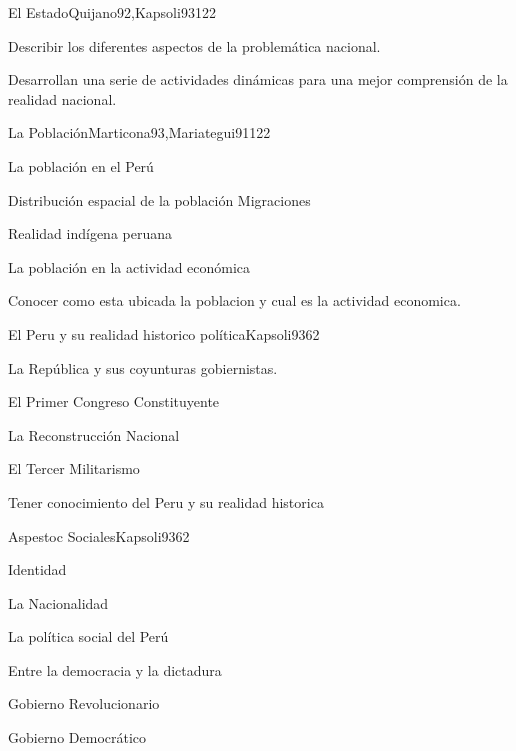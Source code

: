 \begin{syllabus}
\begin{unit}{El Estado}{Quijano92,Kapsoli93}{12}{2}
\begin{learningoutcomes}
      \item Describir los diferentes aspectos de la problemática nacional.
      \item Desarrollan una serie de actividades dinámicas para una mejor comprensión de la realidad nacional.
   \end{learningoutcomes}
\end{unit}

\begin{unit}{La Población}{Marticona93,Mariategui91}{12}{2}
\begin{topics}
	\item La población en el Perú
	\item Distribución espacial de la población Migraciones
	\item Realidad indígena peruana
	\item La población en la actividad económica
\end{topics}

\begin{learningoutcomes}
      \item Conocer como esta ubicada la poblacion y cual es la actividad economica.
   \end{learningoutcomes}
\end{unit}

\begin{unit}{El Peru y su realidad historico política}{Kapsoli93}{6}{2}
\begin{topics}
	\item La República y sus coyunturas gobiernistas.
	\item El Primer Congreso Constituyente
	\item La Reconstrucción Nacional
	\item El Tercer Militarismo
\end{topics}

\begin{learningoutcomes}
      \item Tener conocimiento del Peru y su realidad historica
\end{learningoutcomes}
\end{unit}

\begin{unit}{Aspestoc Sociales}{Kapsoli93}{6}{2}
\begin{topics}
	\item Identidad
	\item La Nacionalidad
	\item La política social del Perú
	\item Entre la democracia y la dictadura
	\item Gobierno Revolucionario
	\item Gobierno Democrático
\end{topics}


\end{unit}
\end{syllabus}
